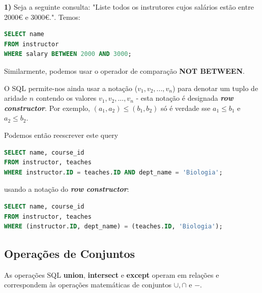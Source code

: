 \documentclass[oneside]{book}
\theoremstyle{definition}
\begin{document}
\textbf{1)} Seja a seguinte consulta: "Liste todos os instrutores cujos salários estão entre 2000€ e 3000€.". Temos:
\begin{lstlisting}[language=SQL, morekeywords={REFERENCES, REFRESH, MATERIALIZED, CONCURRENTLY}, framesep=8pt, xleftmargin=40pt, framexleftmargin=40pt, frame=tb, framerule=0pt]
SELECT name
FROM instructor
WHERE salary BETWEEN 2000 AND 3000;
\end{lstlisting}

Similarmente, podemos usar o operador de comparação \textbf{NOT BETWEEN}.

O SQL permite-nos ainda usar a notação ($v_{1}, v_{2}, ..., v_{n}$) para denotar um tuplo de aridade $n$ contendo os valores $v_1, v_2, ..., v_n$ - esta notação é designada \textbf{\textit{row constructor}}. Por exemplo, $(a_1, a_2) \leq (b_1, b_2)$ só é verdade sse $a_1 \leq b_1$ e $a_2 \leq b_2$.

Podemos então reescrever este query
\begin{lstlisting}[language=SQL, morekeywords={REFERENCES, REFRESH, MATERIALIZED, CONCURRENTLY}, framesep=8pt, xleftmargin=40pt, framexleftmargin=40pt, frame=tb, framerule=0pt]
SELECT name, course_id
FROM instructor, teaches
WHERE instructor.ID = teaches.ID AND dept_name = 'Biologia';
\end{lstlisting}
usando a notação do \textbf{\textit{row constructor}}:
\begin{lstlisting}[language=SQL, morekeywords={REFERENCES, REFRESH, MATERIALIZED, CONCURRENTLY}, framesep=8pt, xleftmargin=40pt, framexleftmargin=40pt, frame=tb, framerule=0pt]
SELECT name, course_id
FROM instructor, teaches
WHERE (instructor.ID, dept_name) = (teaches.ID, 'Biologia');
\end{lstlisting}

\subsection{Operações de Conjuntos}
As operações SQL \textbf{union}, \textbf{intersect} e \textbf{except} operam em relações e correspondem às operações matemáticas de conjuntos $\cup, \cap$ e $-$.
\end{document}
